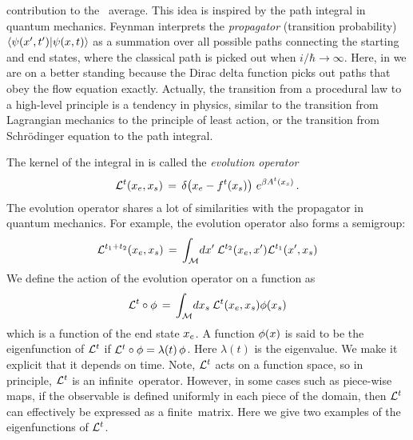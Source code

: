 contribution to the \spt\ average.
This idea is inspired  by the path integral in quantum mechanics.
Feynman interprets the \emph{propagator} (transition probability)
$\braket{\psi(x',t')}{\psi(x, t)}$  as a summation over all
possible paths connecting the starting and end states, where
the classical path is picked out
when $i/\hbar \to \infty$. Here, in  we are on a better
standing because the Dirac delta function picks out paths that obey the flow equation
exactly.
Actually, the transition from a procedural law  to a high-level
principle  is a tendency in physics, similar to the transition from
Lagrangian mechanics to the principle of least action, or the transition from
Schr\"odinger equation to the path integral.

The kernel of the integral in  is called the \emph{evolution operator}
\begin{equation}
    \mathcal{L}^t(x_e, x_s)\,=\,
    \delta\negthinspace\left( {x_e- {f^{t}(x_s)}} \right)\, e^{\beta A^t(x_s)}
    \, .
    \label{eq:evooper}
\end{equation}
The evolution operator shares a lot of similarities with the propagator
in quantum mechanics. For example,
the evolution operator also forms a semigroup:
\begin{equation}
  \label{eq:lsemi}
  \mathcal{L}^{t_1+t_2}(x_e, x_s)\,=\,
  {\int_{\mathcal{M}}{\!d x'}\:}  \mathcal{L}^{t_2}(x_e, x')  \mathcal{L}^{t_1}(x', x_s)
\end{equation}
We define the action of the evolution operator on a function as
\begin{equation}
  \label{eq:evoact}
  \mathcal{L}^t \circ \phi \,=\,
  {\int_{\mathcal{M}}{\!d x_s}\:} \mathcal{L}^t(x_e, x_s) \phi(x_s)
\end{equation}
which is a function of the end state $x_e$.
A function $\phi(x)$ is said to be the eigenfunction of $\mathcal{L}^t$ if
$\mathcal{L}^t \circ \phi = \lambda(t)\, \phi$. Here $\lambda(t)$ is the eigenvalue.
We make it explicit that it depends on time.
Note, $\mathcal{L}^t$ acts on a function space, so in principle,
$\mathcal{L}^t$ is an infinite\dmn\ operator.
However, in some cases such as piece-wise maps, if the observable is defined
uniformly in each piece of the domain, then $\mathcal{L}^t$ can effectively
be expressed as a finite\dmn\ matrix.
Here we give two examples of the eigenfunctions of $\mathcal{L}^t$.

